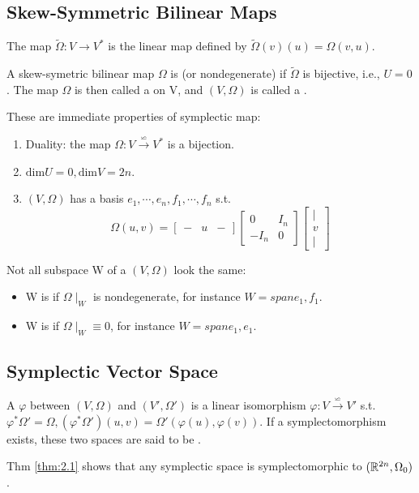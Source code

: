 \documentclass[4paper]{article}
\begin{document}
\subsection{Skew-Symmetric Bilinear Maps}
\begin{definition}
The map $\tilde{\Omega}:V\rightarrow V^*$ is the linear map defined by $\tilde{\Omega}(v)(u)=\Omega
(v,u)$.
\end{definition}
\begin{definition}
A skew-symetric bilinear map $\Omega$ is  (or nondegenerate) if $\tilde{\Omega}$ is 
bijective, i.e., $U={0}$. The map $\Omega$ is then called a  on V,
and $(V,\Omega)$ is called a .
\end{definition}
\begin{note} 
These are immediate properties of symplectic map:
\begin{enumerate}
\item Duality: the map $\Omega : V \overset{\backsimeq}{\rightarrow} V^*$ is a bijection.
\item $\mathrm{dim}U=0,\mathrm{dim}V=2n$.
\item $(V,\Omega)$ has a basis $e_1,\cdots,e_n,f_1,\cdots,f_n$ s.t.
\begin{equation*}
\Omega(u,v)=
\begin{bmatrix}
- & u & -
\end{bmatrix}
\begin{bmatrix}
0    & I_n \\
-I_n & 0
\end{bmatrix}
\begin{bmatrix}
| \\
v \\
|
\end{bmatrix}
\end{equation*}
\end{enumerate}
\end{note}
\begin{remark}
Not all subspace W of a $(V,\Omega)$ look the same:
\begin{itemize}
\item W is  if $\Omega\mid_W$ is nondegenerate, for instance $W=span{e_1,f_1}$.
\item W is  if $\Omega\mid_W\equiv0$, for instance $W=span{e_1,e_1}$.
\end{itemize}
\end{remark}
\subsection{Symplectic Vector Space}
\begin{definition}
A  $\varphi$ between $(V,\Omega)$ and $(V',\Omega ')$ is a linear isomorphism
$\varphi:V\overset{\backsimeq}{\rightarrow} V'$ s.t. $\varphi^*\Omega '=\Omega, (\varphi^*
\Omega ')(u,v)=\Omega '(\varphi(u),\varphi(v))$. If a symplectomorphism exists, these two spaces are
said to be .
\end{definition}
\begin{remark}
Thm \ref{thm:2.1} shows that any symplectic space is symplectomorphic to $(\mathbb{R}^{2n},\Omega_0)$.
\end{remark}
\end{document}

